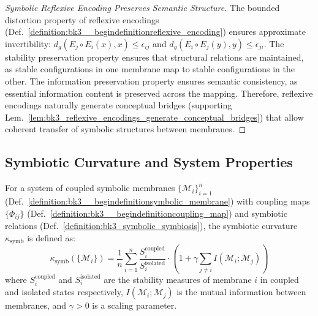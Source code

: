 \begin{proof}[Symbolic Reflexive Encoding Preserves Semantic Structure]
\label{proof:bk3_reflexive_encoding_preserves_structure}
The bounded distortion property of reflexive encodings (Def.~\ref{definition:bk3__begindefinitionreflexive_encoding}) ensures approximate invertibility: $d_g(E_j \circ E_i(x), x) \leq \epsilon_{ij}$ and $d_g(E_i \circ E_j(y), y) \leq \epsilon_{ji}$. The stability preservation property ensures that structural relations are maintained, as stable configurations in one membrane map to stable configurations in the other. The information preservation property ensures semantic consistency, as essential information content is preserved across the mapping. Therefore, reflexive encodings naturally generate conceptual bridges (supporting Lem.~\ref{lem:bk3_reflexive_encodings_generate_conceptual_bridges}) that allow coherent transfer of symbolic structures between membranes.
\end{proof}

\subsection{Symbiotic Curvature and System Properties} \label{subsec:bk3_symbiotic_curvature_system_properties}

\begin{definition} \label{definition:bk3__begindefinitionsymbiotic_curvature}
For a system of coupled symbolic membranes $\{\mathcal{M}_i\}_{i=1}^n$ (Def.~\ref{definition:bk3__begindefinitionsymbolic_membrane}) with coupling maps $\{\Phi_{ij}\}$ (Def.~\ref{definition:bk3__begindefinitioncoupling_map}) and symbiotic relations (Def.~\ref{definition:bk3_symbolic_symbiosis}), the symbiotic curvature $\kappa_{\text{symb}}$ is defined as:
\[
\kappa_{\text{symb}}(\{\mathcal{M}_i\}) = \frac{1}{n}\sum_{i=1}^n \frac{S_i^{\text{coupled}}}{S_i^{\text{isolated}}} \cdot \left(1 + \gamma \sum_{j \neq i} I(\mathcal{M}_i; \mathcal{M}_j)\right)
\]
where $S_i^{\text{coupled}}$ and $S_i^{\text{isolated}}$ are the stability measures of membrane $i$ in coupled and isolated states respectively, $I(\mathcal{M}_i; \mathcal{M}_j)$ is the mutual information between membranes, and $\gamma > 0$ is a scaling parameter.
\end{definition}

